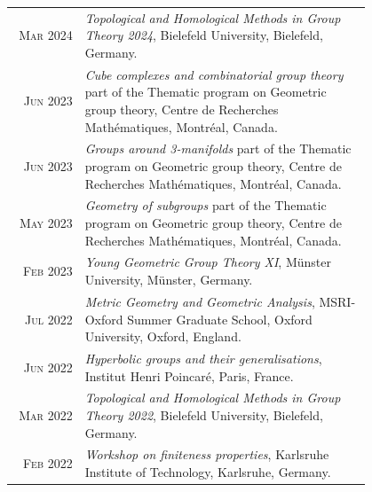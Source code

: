 \documentclass[a4paper,10pt]{article} %
\begin{document}
\begin{longtable}{rp{0.8\linewidth}}
    \textsc{Mar 2024} & \emph{Topological and Homological Methods in Group Theory 2024}, Bielefeld
    University, Bielefeld, Germany. \\ %

    \textsc{Jun 2023} & \emph{Cube complexes and combinatorial group theory} part of the Thematic program on Geometric group theory, Centre de Recherches Mathématiques, Montréal, Canada. \\ %
    
    \textsc{Jun 2023} & \emph{Groups around 3-manifolds} part of the Thematic program on Geometric group theory,
    Centre de Recherches Mathématiques, Montréal, Canada. \\ %

    \textsc{May 2023} & \emph{Geometry of subgroups} part of the Thematic program on Geometric group theory, Centre
    de Recherches Mathématiques, Montréal, Canada. \\ %

    \textsc{Feb 2023} & \emph{Young Geometric Group Theory XI}, Münster University, Münster, Germany. \\ %

    \textsc{Jul 2022} & \emph{Metric Geometry and Geometric Analysis}, MSRI-Oxford Summer Graduate
    School, Oxford University, Oxford, England. \\ %

    \textsc{Jun 2022} & \emph{Hyperbolic groups and their generalisations}, Institut Henri Poincaré, Paris, France. \\ %

    \textsc{Mar 2022} & \emph{Topological and Homological Methods in Group Theory 2022}, Bielefeld University, Bielefeld, Germany. \\ %
    
    \textsc{Feb 2022} & \emph{Workshop on finiteness properties}, Karlsruhe Institute of Technology, Karlsruhe, Germany. \\ %

\end{longtable}

\end{document}
